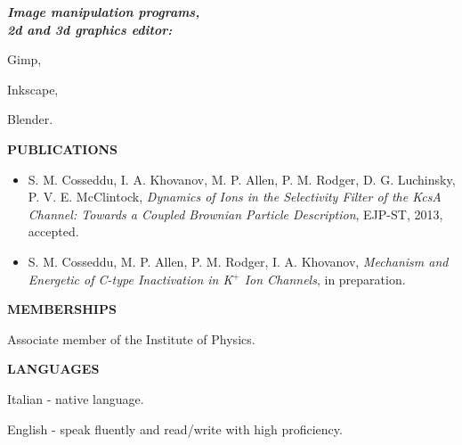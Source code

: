 \documentclass[a4paper,11pt,final]{memoir}
\newcommand{\Sep}{\vspace{1.em}}
\newcommand{\SmallSep}{\vspace{0.2em}}
\newcommand{\CVSection}[1]
	{\Large\textbf{#1}\par
	\SmallSep\normalsize\normalfont}
\newcommand{\CVItem}[2]
	{\textit{\textbf{\color{RoyalBlue} #1}} #2}
\begin{document}
\begin{multicols}{3}
\CVItem{Image manipulation programs,\\2d and 3d graphics editor:\hfill}
\begin{compactitem}[\color{RoyalBlue}$\circ$]
\item Gimp,
\item Inkscape,
\item Blender.
\end{compactitem}

\end{multicols}




\Sep
\CVSection{PUBLICATIONS} 
\begin{itemize} \itemsep -1.5pt %
\item S. M. Cosseddu, I. A. Khovanov, M. P. Allen, P. M. Rodger, D. G. Luchinsky,
  P. V. E. McClintock, \textit{Dynamics of Ions in the Selectivity Filter of the KcsA Channel: Towards a Coupled
  Brownian Particle Description}, EJP-ST, 2013, accepted.
\item S. M. Cosseddu, M. P. Allen, P. M. Rodger, I. A. Khovanov, \textit{Mechanism and Energetic
  of C-type Inactivation in K$^+$ Ion Channels}, in preparation.
\end{itemize}


\Sep
\CVSection{MEMBERSHIPS} 
Associate member of the Institute of Physics. 

\Sep
\CVSection{LANGUAGES} 
\begin{compactitem}[\color{RoyalBlue}$\circ$]
\item Italian - native language.
\item English - speak fluently and read/write with high proficiency.
\end{compactitem}
\end{document}
